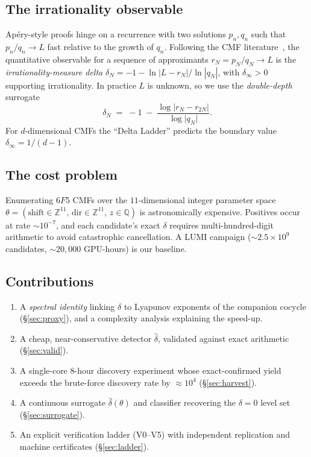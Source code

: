 \documentclass[11pt,a4paper]{article}
\theoremstyle{definition}
\newcommand{\dhat}{\hat{\delta}}
\newcommand{\Z}{\mathbb{Z}}
\newcommand{\Q}{\mathbb{Q}}
\begin{document}
\subsection{The irrationality observable}
Ap\'ery-style proofs hinge on a recurrence with two solutions $p_n,q_n$ such that
$p_n/q_n\to L$ fast relative to the growth of $q_n$. Following the CMF
literature~\cite{cmf2023}, the quantitative observable for a sequence of approximants
$r_N=p_N/q_N\to L$ is the \emph{irrationality-measure delta}
$\delta_N = -1 - \ln|L-r_N|/\ln|q_N|$, with $\delta_\infty>0$ supporting irrationality. In
practice $L$ is unknown, so we use the \emph{double-depth} surrogate
\begin{equation}
  \delta_N \;=\; -1 \;-\; \frac{\log\lvert r_N - r_{2N}\rvert}{\log\lvert q_N\rvert}.
  \label{eq:delta}
\end{equation}
For $d$-dimensional CMFs the ``Delta Ladder'' predicts the boundary value
$\delta_\infty = 1/(d-1)$.

\subsection{The cost problem}
Enumerating $6F5$ CMFs over the $11$-dimensional integer parameter space
$\theta=(\mathrm{shift}\in\Z^{11},\,\mathrm{dir}\in\Z^{11},\,z\in\Q)$ is astronomically
expensive. Positives occur at rate ${\sim}10^{-7}$, and each candidate's exact $\delta$
requires multi-hundred-digit arithmetic to avoid catastrophic cancellation. A LUMI campaign
(${\sim}2.5\times10^{9}$ candidates, ${\sim}20{,}000$ GPU-hours) is our baseline.

\subsection{Contributions}
\begin{enumerate}[nosep]
\item A \emph{spectral identity} linking $\delta$ to Lyapunov exponents of the companion
cocycle (\S\ref{sec:proxy}), and a complexity analysis explaining the speed-up.
\item A cheap, near-conservative detector $\dhat$, validated against exact arithmetic
(\S\ref{sec:valid}).
\item A single-core $8$-hour discovery experiment whose exact-confirmed yield exceeds the
brute-force discovery rate by ${\approx}10^{4}$ (\S\ref{sec:harvest}).
\item A continuous surrogate $\dhat(\theta)$ and classifier recovering the $\delta=0$ level
set (\S\ref{sec:surrogate}).
\item An explicit verification ladder (V0--V5) with independent replication and machine
certificates (\S\ref{sec:ladder}).
\end{enumerate}
\end{document}
